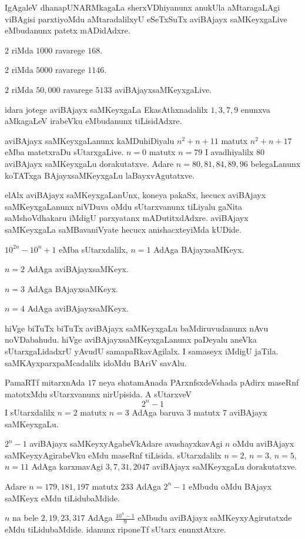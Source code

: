 IgAgaleV dhanapUNARMkagaLa sherxVDhiyanunx anukUla aMtaragaLAgi viBAgisi parxtiyoMdu aMtaradalilxyU eSeTxSuTx aviBAjayx saMKeyxgaLive eMbudanunx patetx mADidAdxre.

$2$ riMda $1000$ ravarege $168$.
 
$2$ riMda $5000$ ravarege $1146$. 

$2$ riMda $50,000$ ravarege $5133$ aviBAjayxsaMKeyxgaLive.

idara jotege aviBAjayx saMKeyxgaLa EkasAthxnadalilx $1,3,7,9$ enunxva aMkagaLeV irabeVku eMbudanunx tiLisidAdxre.

aviBAjayx saMKeyxgaLanunx kaMDuhiDiyalu $n^2+n+11$ matutx $n^2+n+17$ eMba matetxraDu sUtarxgaLive. $n=0$ matutx $n=79$ I avadhiyalilx $80$ aviBAjayx saMKeyxgaLu dorakutatxve. Adare $n=80,81,84,89,96$ belegaLanunx koTATxga BAjayxsaMKeyxgaLu laBayxvAgutatxve.

elAlx aviBAjayx saMKeyxgaLanUnx, koneya pakaSx, hecucx aviBAjayx saMKeyxgaLanunx niVDuva oMdu sUtarxvanunx tiLiyalu gaNita saMshoVdhakaru iMdigU parxyatanx mADutitxdAdxre. aviBAjayx saMKeyxgaLa saMBavaniVyate hecucx anishacxteyiMda kUDide.

$10^{2n}-10^n+1$ eMba sUtarxdalilx, $n=1$ AdAga BAjayxsaMKeyx. 

$n=2$ AdAga aviBAjayxsaMKeyx.

$n=3$ AdAga BAjayxsaMKeyx.

$n=4$ AdAga aviBAjayxsaMKeyx.

hiVge biTuTx biTuTx aviBAjayx saMKeyxgaLu baMdiruvudanunx nAvu noVDabahudu. hiVge aviBAjayxsaMKeyxgaLanunx paDeyalu aneVka sUtarxgaLidadxrU yAvudU samapaRka\-vAgilalx. I samaseyx iMdigU jaTila. saMKAyxparxpaMcadalilx idoMdu BAriV savAlu.

PamaRTf mitarxnAda $17$ neya shatamAnada PArxnfsxdeVshada pAdirx maseRnf matotxMdu sUtarxvanunx nirUpisida. A sUtarxveV 
$$
2^n-1
$$
I sUtarxdalilx $n=2$ matutx $n=3$ AdAga baruva $3$ matutx $7$ aviBAjayx saMKeyxgaLu.

$2^n-1$ aviBAjayx saMKeyxyAgabeVkAdare avashayxkavAgi $n$ oMdu aviBAjayx saMKeyxyAgirabeVku eMdu maseRnf tiLisida. sUtarxdalilx $n=2$, $n=3$, $n=5$, $n=11$ AdAga karxmavAgi $3,7,31,2047$ aviBAjayx saMKeyxgaLu dorakutatxve.

Adare $n= 179,181,197$ matutx $233$ AdAga $2^{n}-1$ eMbudu oMdu BAjayx saMKeyx eMdu tiLidubaMdide.

$n$ na bele $2,19,23,317$ AdAga $\frac{10^n-1}{9}$ eMbudu aviBAjayx saMKeyxyAgiru\-tatxde eMdu tiLidubaMdide. idanunx riponeTf sUtarx enunxtAtxre.

